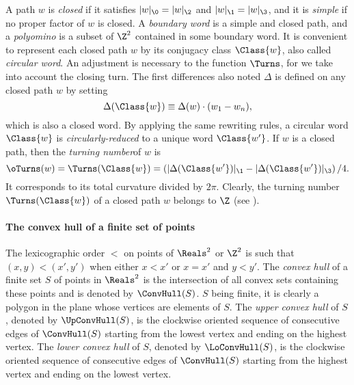 A path $w$ is \emph{closed}  if it satisfies $|w|_\0 = |w|_{\2}$ and $|w|_\1 = |w|_{\3}$, and it  is \emph{simple} if no proper factor of $w$ is  closed. 
A \emph{boundary word} is a simple and closed path, and a \emph{polyomino} is a subset of $\Z^2$ contained in some boundary word.  It is convenient to represent each closed path $w$  by its conjugacy class $\Class{w}$, also called \emph{circular word}. An adjustment is necessary to the function $\Turns$, for we take into account the closing turn. The first differences also noted $\Delta$ is defined on any closed path $w$ by setting
\[\Delta(\Class{w})\equiv \Delta(w) \cdot (w_1 - w_n), \]
which is also a closed word.
By applying the same rewriting rules, a circular word $\Class{w}$ is \emph{circularly-reduced} to a unique  word $\Class{w'}$. If $w$ is a closed path, then the \emph{turning number}\footnotemark[1] of $w$ is 
\[\oTurns(w)=\Turns(\Class{w})=\left(|\Delta(\Class{w'})|_\1 -|\Delta(\Class{w'})|_\3 \right)/4.\]
 It corresponds to its total curvature divided by $2\pi$. Clearly, the turning number $\Turns(\Class{w})$ of a closed path $w$ belongs to $\Z$  (see \cite{bll2,bll3}). 




\paragraph{The convex hull of a finite set of points}The lexicographic order $<$ on points of $\Reals^2$ or $\Z^2$ is such
 that $(x,y) < (x',y')$ when either $x < x'$ or $x=x'$ and $y<
 y'$. The {\em convex hull} of a finite set $S$ of points in $\Reals^2$
 is the intersection of all
 convex sets containing these points and is denoted by
 $\ConvHull(S)$. $S$ being finite, it is clearly a polygon in the
 plane whose vertices are elements of $S$. The {\em upper convex
 hull} of $S$, denoted by $\UpConvHull(S)$, is the clockwise oriented
 sequence of consecutive edges of $\ConvHull(S)$ starting from the
 lowest vertex and ending on the highest vertex. The {\em lower
 convex hull} of $S$, denoted by $\LoConvHull(S)$, is the clockwise
 oriented sequence of consecutive edges of $\ConvHull(S)$ starting
 from the highest vertex and ending on the lowest vertex.



